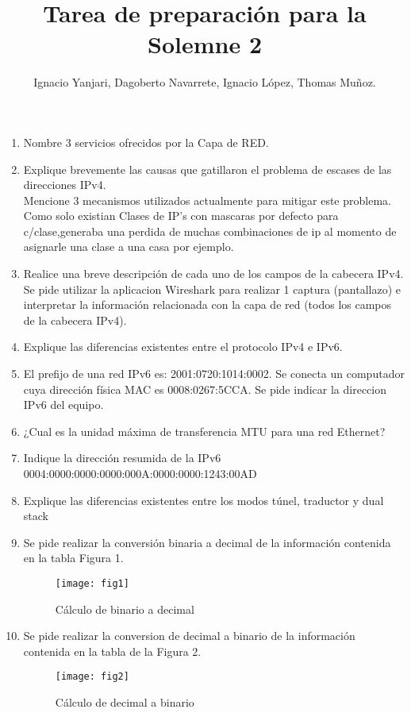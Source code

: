 \documentclass{udparticle}
\title{Tarea de preparación para la Solemne 2}
\author{Ignacio Yanjari, Dagoberto Navarrete, Ignacio López, Thomas Muñoz.}
\begin{document}
\maketitle
\begin{enumerate}
\item Nombre 3 servicios ofrecidos por la Capa de RED.
\item Explique brevemente las causas que gatillaron el problema de escases de las direcciones IPv4.\\
Mencione 3 mecanismos utilizados actualmente para mitigar este problema.\\
Como solo existian Clases de IP's con mascaras por defecto para c/clase,generaba una perdida de muchas combinaciones de ip al
momento de asignarle una clase a una casa por ejemplo.

\item Realice una breve descripción de cada uno de los campos de la cabecera IPv4. Se pide utilizar la aplicacion Wireshark para realizar 1 captura (pantallazo) e interpretar la información relacionada con la capa de red (todos los campos de la cabecera IPv4).
\item Explique las diferencias existentes entre el protocolo IPv4 e IPv6.
\item El prefijo de una red IPv6 es: 2001:0720:1014:0002. Se conecta un
computador cuya dirección física MAC es 0008:0267:5CCA. Se pide indicar la direccion IPv6 del equipo.
\item ¿Cual es la unidad máxima de transferencia MTU para una red Ethernet?
\item Indique la dirección resumida de la IPv6 0004:0000:0000:0000:000A:0000:0000:1243:00AD
\item Explique las diferencias existentes entre los modos túnel, traductor y dual stack
\item Se pide realizar la conversión binaria a decimal de la información contenida en la tabla Figura 1.
	\begin{figure}[H]
	\centering
	\texttt{[image: fig1]}
	\caption{Cálculo de binario a decimal}
	\end{figure}
\clearpage

\item Se pide realizar la conversion de decimal a binario de la información contenida en la tabla de la Figura 2.
	\begin{figure}[H]
	\centering
	\texttt{[image: fig2]}
	\caption{Cálculo de decimal a binario}
	\end{figure}


\end{enumerate}
\end{document}
